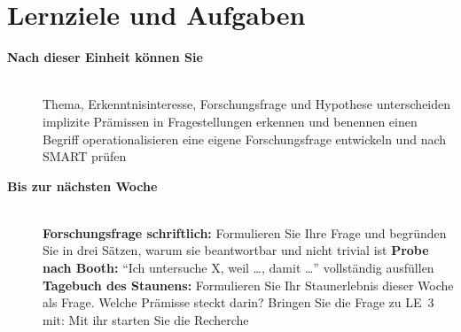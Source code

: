 \section{Lernziele und Aufgaben}
\begin{description}
\item[{\rot\bf Nach dieser Einheit können Sie}]~\\[-\lblskip]
\bi
  \ite Thema, Erkenntnisinteresse, Forschungsfrage und Hypothese
    unterscheiden
  \ite implizite Prämissen in Fragestellungen erkennen und benennen
  \ite einen Begriff operationalisieren
  \ite eine eigene Forschungsfrage entwickeln und nach SMART prüfen
\ei
\os{\newpage}

\item[{\rot\bf Bis zur nächsten Woche}]~\\[-\lblskip]
\bi
  \ite \textbf{Forschungsfrage schriftlich:} Formulieren Sie Ihre Frage
    und begründen Sie in drei Sätzen, warum sie beantwortbar und nicht
    trivial ist
  \ite \textbf{Probe nach Booth:} \enquote{Ich untersuche X, weil \dots,
    damit \dots} vollständig ausfüllen
  \ite \textbf{Tagebuch des Staunens:} Formulieren Sie Ihr Staunerlebnis
    dieser Woche als Frage. Welche Prämisse steckt darin?
  \ite Bringen Sie die Frage zu LE~3 mit: Mit ihr starten Sie die
    Recherche
\ei
\os{\newpage}
\end{description}

